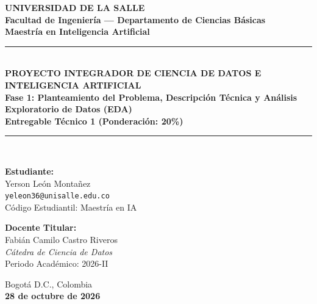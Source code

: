 \documentclass[11pt,letterpaper]{article}
\begin{document}
\begin{titlepage}
    \centering
    \vspace*{0.5cm}
    {\huge \textbf{\textcolor{lasalleblue}{UNIVERSIDAD DE LA SALLE}}}\\[0.3cm]
    {\large \textbf{Facultad de Ingeniería — Departamento de Ciencias Básicas}}\\[0.2cm]
    {\large \textbf{Maestría en Inteligencia Artificial}}\\[1.8cm]

    \rule{\linewidth}{1.5pt}\\[0.4cm]
    {\LARGE \textbf{\textcolor{lasalleblue}{PROYECTO INTEGRADOR DE CIENCIA DE DATOS E INTELIGENCIA ARTIFICIAL}}}\\[0.3cm]
    {\Large \textbf{Fase 1: Planteamiento del Problema, Descripción Técnica y Análisis Exploratorio de Datos (EDA)}}\\[0.2cm]
    {\normalsize \textbf{Entregable Técnico 1 (Ponderación: 20\%)}}\\[0.4cm]
    \rule{\linewidth}{1.5pt}\\[2.0cm]

    \begin{minipage}[t]{0.48\textwidth}
        \textbf{Estudiante:}\\
        Yerson León Montañez\\
        \texttt{yeleon36@unisalle.edu.co}\\
        Código Estudiantil: Maestría en IA
    \end{minipage}
    \hfill
    \begin{minipage}[t]{0.48\textwidth}
        \begin{flushright}
            \textbf{Docente Titular:}\\
            Fabián Camilo Castro Riveros\\
            \textit{Cátedra de Ciencia de Datos}\\
            Periodo Académico: 2026-II
        \end{flushright}
    \end{minipage}

    \vfill
    {\large Bogotá D.C., Colombia\\ \textbf{28 de octubre de 2026}}
\end{titlepage}

\newpage
\tableofcontents
\newpage

\end{document}
